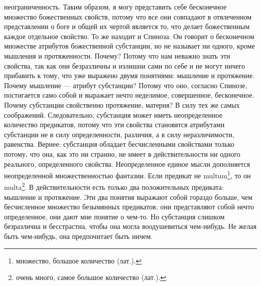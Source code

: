 \documentclass[12pt,oneside]{book}
\begin{document}
неограниченность. Таким образом, я могу представить себе бесконечное множество божественных свойств, потому что все они совпадают в отвлеченном представлении о боге и общей их чертой является то, что делает божественным каждое отдельное свойство. То же находит и Спиноза. Он говорит о бесконечном множестве атрибутов божественной субстанции, но не называет ни одного, кроме мышления и протяженности. Почему? Потому что нам неважно знать эти свойства, так как они безразличны и излишни сами по себе и не могут ничего прибавить к тому, что уже выражено двумя понятиями: мышление и протяжение. Почему мышление --- атрибут субстанции? Потому что оно, согласно Спинозе, постигается само собой и выражает нечто неделимое, совершенное, бесконечное. Почему субстанции свойственно протяжение, материя? В силу тех же самых соображений. Следовательно, субстанция может иметь неопределенное количество предикатов, потому что эти свойства становятся атрибутами субстанции не в силу определенности, различия, а в силу неразличимости, равенства. Вернее: субстанция обладает бесчисленными свойствами только потому, что она, как это ни странно, не имеет в действительности ни одного реального, определенного свойства. Неопределенное единое мысли дополняется неопределенной множественностью фантазии. Если предикат не multum\footnote{множество, большое количество (лат.).}, то он multa\footnote{очень много, самое большое количество (лат.).}. В действительности есть только два положительных предиката: мышление и протяжение. Эти два понятия выражают собой гораздо больше, чем бесчисленное множество безымянных предикатов; они представляют собой нечто определенное, они дают мне понятие о чем-то. Но субстанция слишком безразлична и бесстрастна, чтобы она могла воодушевиться чем-нибудь. Не желая быть чем-нибудь, она предпочитает быть ничем.
\end{document}
